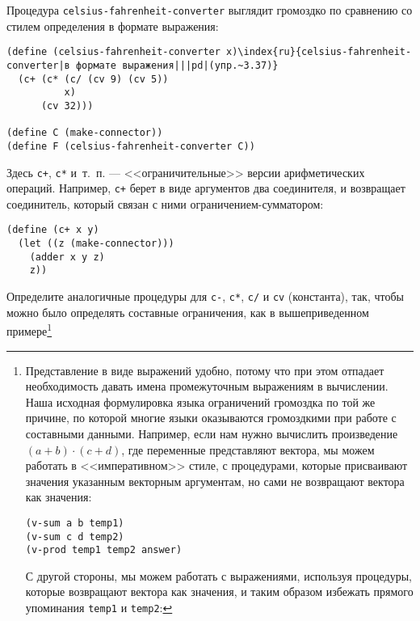 \begin{exercise}{3.37}\label{EX3.37}%
Процедура {\tt celsius-fahrenheit-converter}
выглядит громоздко по сравнению со стилем определения в формате выражения:

\begin{Verbatim}[fontsize=\small]
(define (celsius-fahrenheit-converter x)\index{ru}{celsius-fahrenheit-converter|в формате выражения|||pd|(упр.~3.37)}
  (c+ (c* (c/ (cv 9) (cv 5))
          x)
      (cv 32)))

(define C (make-connector))
(define F (celsius-fahrenheit-converter C))
\end{Verbatim}
Здесь {\tt c+}, {\tt c*} и~т.~п. --- <<ограничительные>>
версии арифметических операций.  Например, {\tt c+} берет в
виде аргументов два соединителя, и возвращает соединитель, который
связан с ними ограничением-сумматором:

\begin{Verbatim}[fontsize=\small]
(define (c+ x y)
  (let ((z (make-connector)))
    (adder x y z)
    z))
\end{Verbatim}
Определите аналогичные процедуры для {\tt c-}, {\tt c*},
{\tt c/} и {\tt cv} (константа), так, чтобы можно было
определять составные ограничения, как в вышеприведенном
примере\footnote{Представление в виде выражений удобно, потому что
при этом отпадает необходимость давать имена промежуточным выражениям в вычислении.
%
%
%
%
Наша
исходная формулировка языка ограничений громоздка по той же причине,
по которой многие языки оказываются громоздкими при работе с составными
данными.  Например, если нам нужно вычислить произведение $(a+b)
\cdot (c+d)$, где переменные представляют вектора, мы можем
работать в <<императивном>> стиле, с процедурами, которые присваивают
значения указанным векторным аргументам, но сами не возвращают вектора
как значения:

\begin{Verbatim}[fontsize=\footnotesize]
(v-sum a b temp1)
(v-sum c d temp2)
(v-prod temp1 temp2 answer)
\end{Verbatim}
С другой стороны, мы можем работать с выражениями, используя процедуры,
которые возвращают вектора как значения, и таким образом избежать
прямого упоминания {\tt temp1} и {\tt temp2}:

}
\end{exercise}
